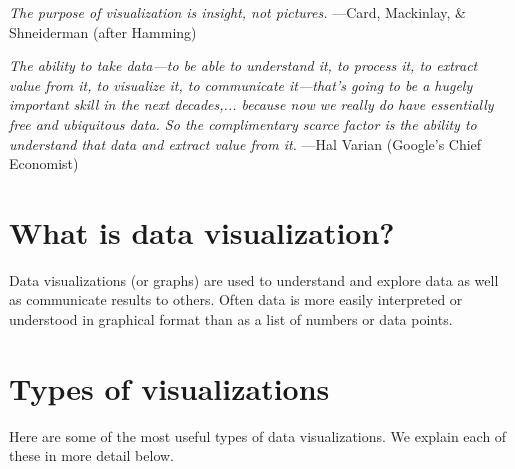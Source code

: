 \label{lab:DataVis}

\noindent\emph{The purpose of visualization is insight, not pictures.} \small{---Card, Mackinlay, \& Shneiderman (after Hamming)}

\medskip

\noindent\emph{The ability to take data---to be able to understand it, to process it,
to extract value from it, to visualize it, to communicate it---that's
going to be a hugely important skill in the next decades,... because
now we really do have essentially free and ubiquitous data. So the
complimentary scarce factor is the ability to understand that data and
extract value from it.} \small{---Hal Varian (Google's Chief Economist)}



\section*{What is data visualization?} 
Data visualizations (or graphs) are used to understand and explore data as well as communicate results to others.  Often data is more easily interpreted or understood in graphical format than as a list of numbers or data points.  




\section*{Types of visualizations}

Here are some of the most useful types of data visualizations.  We explain each of these in more detail below.

